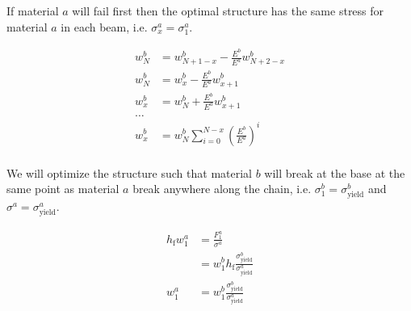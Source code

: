 If material $a$ will fail first then the optimal structure has the same stress for material $a$ in each beam, i.e. $\sigma_x^a = \sigma_1^a$.

\begin{align*}
	w_N^b &= w_{N+1-x}^b - \frac{E^b}{E^a} w^b_{N+2-x} \\
	w_N^b &= w_{x}^b - \frac{E^b}{E^a} w^b_{x+1} \\
	w_{x}^b &= w_N^b + \frac{E^b}{E^a} w^b_{x+1} \\
	\dots \\
	w^b_{x} &= w^b_N \sum\limits_{i=0}^{N-x} \left(\frac{E^b}{E^a}\right)^i \\
\end{align*}

We will optimize the structure such that material $b$ will break at the base at the same point as material $a$ break anywhere along the chain, i.e. $\sigma^b_1 = \sigma^b_\text{yield}$ and $\sigma^a  = \sigma^a_\text{yield}$.

\begin{align*}
	h_\text{f} w_1^a &= \frac{F_1^a}{\sigma^a} \\
	&= w_1^b h_\text{f} \frac{\sigma^b_\text{yield}}{\sigma^a_\text{yield}}\\
	w_1^a &= w_1^b \frac{\sigma^b_\text{yield}}{\sigma^a_\text{yield}}\\
\end{align*}



